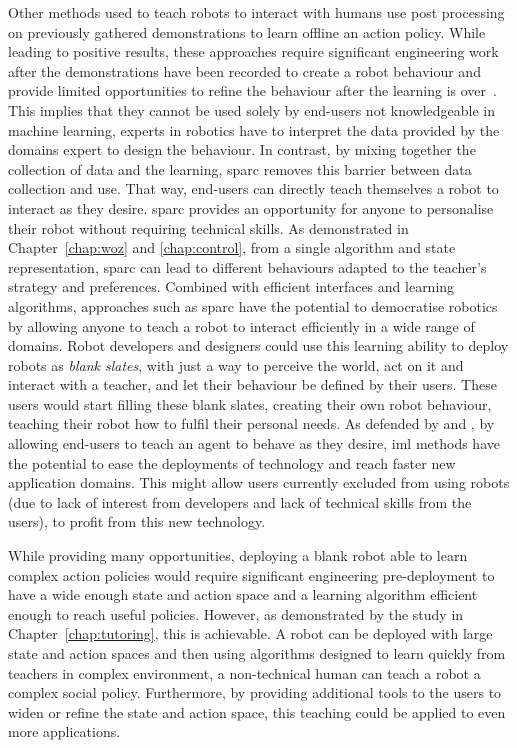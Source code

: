 Other methods used to teach robots to interact with humans use post processing on previously gathered demonstrations to learn offline an action policy. While leading to positive results, these approaches require significant engineering work after the demonstrations have been recorded to create a robot behaviour and provide limited opportunities to refine the behaviour after the learning is over~\citep{liu2014train,sequeira2016discovering}. This implies that they cannot be used solely by end-users not knowledgeable in machine learning, experts in robotics have to interpret the data provided by the domains expert to design the behaviour. In contrast, by mixing together the collection of data and the learning, \gls{sparc} removes this barrier between data collection and use. That way, end-users can directly teach themselves a robot to interact as they desire.
\gls{sparc} provides an opportunity for anyone to personalise their robot without requiring technical skills. As demonstrated in Chapter~\ref{chap:woz} and \ref{chap:control}, from a single algorithm and state representation, \gls{sparc} can lead to different behaviours adapted to the teacher's strategy and preferences. Combined with efficient interfaces and learning algorithms, approaches such as \gls{sparc} have the potential to democratise robotics by allowing anyone to teach a robot to interact efficiently in a wide range of domains. Robot developers and designers could use this learning ability to deploy robots as \emph{blank slates}, with just a way to perceive the world, act on it and interact with a teacher, and let their behaviour be defined by their users. These users would start filling these blank slates, creating their own robot behaviour, teaching their robot how to fulfil their personal needs. As defended by \cite{fails2003interactive} and \cite{amershi2014power}, by allowing end-users to teach an agent to behave as they desire, \gls{iml} methods have the potential to ease the deployments of technology and reach faster new application domains. This might allow users currently excluded from using robots (due to lack of interest from developers and lack of technical skills from the users), to profit from this new technology.

While providing many opportunities, deploying a blank robot able to learn complex action policies would require significant engineering pre-deployment to have a wide enough state and action space and a learning algorithm efficient enough to reach useful policies. However, as demonstrated by the study in Chapter~\ref{chap:tutoring}, this is achievable. A robot can be deployed with large state and action spaces and then using algorithms designed to learn quickly from teachers in complex environment, a non-technical human can teach a robot a complex social policy. Furthermore, by providing additional tools to the users to widen or refine the state and action space, this teaching could be applied to even more applications.

